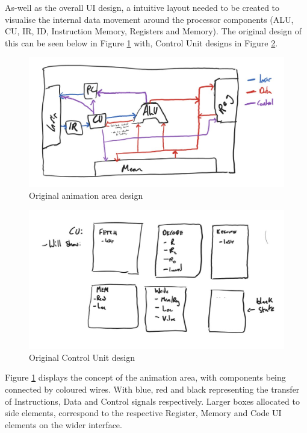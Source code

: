 As-well as the overall \ac{UI} design, a intuitive layout needed to be created to visualise the internal data movement around the processor components (\ac{ALU}, \ac{CU}, \ac{IR}, \ac{ID}, Instruction Memory, Registers and Memory). The original design of this can be seen below in Figure \ref{fig:early_animation_design} with, Control Unit designs in Figure \ref{fig:early_cu_design}.

\begin{figure}[H]
    \centering
    \includegraphics[width=\linewidth]{dissertation/DATA/animation_layout.jpg}
    \caption{Original animation area design}
    \label{fig:early_animation_design}
\end{figure}

\begin{figure}[H]
    \centering
    \includegraphics[width=\linewidth]{dissertation/DATA/control_unit.jpg}
    \caption{Original Control Unit design}
    \label{fig:early_cu_design}
\end{figure}

Figure \ref{fig:early_animation_design} displays the concept of the animation area, with components being connected by coloured wires. With blue, red and black representing the transfer of Instructions, Data and Control signals respectively. Larger boxes allocated to side elements, correspond to the respective Register, Memory and Code \ac{UI} elements on the wider interface.

